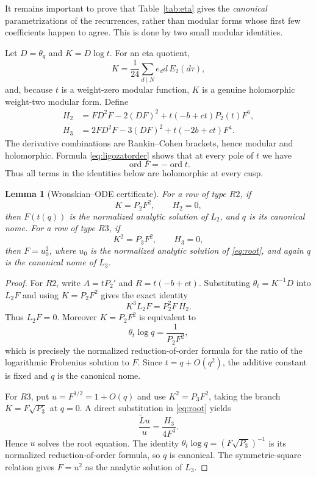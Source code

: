 \documentclass[11pt]{article}
\newtheorem{lemma}[theorem]{Lemma}
\theoremstyle{remark}
\newcommand{\tht}{\theta_t}
\newcommand{\thq}{\theta_q}
\begin{document}
It remains important to prove that Table~\ref{tab:eta} gives the
\emph{canonical} parametrizations of the recurrences, rather than modular
forms whose first few coefficients happen to agree.  This is done by two
small modular identities.

Let $D=\thq$ and $K=D\log t$.  For an eta quotient,
\begin{equation}
 K=\frac1{24}\sum_{d\mid N} e_d d\,E_2(d\tau),
 \label{eq:Keta}
\end{equation}
and, because $t$ is a weight-zero modular function, $K$ is a genuine
holomorphic weight-two modular form.  Define
\begin{align}
H_2&=F D^2F-2(DF)^2+t(-b+ct)P_2(t)F^6,
\label{eq:H2}\\
H_3&=2F D^2F-3(DF)^2+t(-2b+ct)F^4.
\label{eq:H3}
\end{align}
The derivative combinations are Rankin--Cohen brackets, hence modular and
holomorphic.  Formula \eqref{eq:ligozatorder} shows that at every pole of $t$
we have
\begin{equation}
 \operatorname{ord}F=-\operatorname{ord}t.
 \label{eq:polecancel}
\end{equation}
Thus all terms in the identities below are holomorphic at every cusp.

\begin{lemma}[Wronskian--ODE certificate]\label{lem:WH}
For a row of type $R2$, if
\begin{equation}
 K=P_2F^2,\qquad H_2=0,
 \label{eq:WH2}
\end{equation}
then $F(t(q))$ is the normalized analytic solution of $L_2$, and $q$ is its
canonical nome.  For a row of type $R3$, if
\begin{equation}
 K^2=P_3F^2,\qquad H_3=0,
 \label{eq:WH3}
\end{equation}
then $F=u_0^2$, where $u_0$ is the normalized analytic solution of
\eqref{eq:root}, and again $q$ is the canonical nome of $L_3$.
\end{lemma}

\begin{proof}
For $R2$, write $A=tP_2'$ and $R=t(-b+ct)$.  Substituting
$\tht=K^{-1}D$ into $L_2F$ and using $K=P_2F^2$ gives the exact identity
\[
 K^3L_2F=P_2^2F\,H_2.
\]
Thus $L_2F=0$.  Moreover $K=P_2F^2$ is equivalent to
\[
 \tht\log q=\frac1{P_2F^2},
\]
which is precisely the normalized reduction-of-order formula for the ratio of
the logarithmic Frobenius solution to $F$.  Since $t=q+O(q^2)$, the additive
constant is fixed and $q$ is the canonical nome.

For $R3$, put $u=F^{1/2}=1+O(q)$ and use $K^2=P_3F^2$, taking the branch
$K=F\sqrt{P_3}$ at $q=0$.  A direct substitution in \eqref{eq:root} yields
\[
 \frac{\widetilde L u}{u}=\frac{H_3}{4F^4}.
\]
Hence $u$ solves the root equation.  The identity
$\tht\log q=(F\sqrt{P_3})^{-1}$ is its normalized reduction-of-order formula,
so $q$ is canonical.  The symmetric-square relation gives $F=u^2$ as the
analytic solution of $L_3$.
\end{proof}
\end{document}
